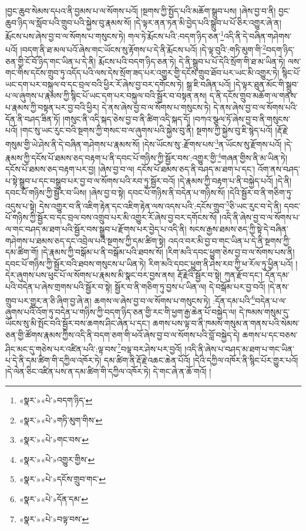 །བྱང་ཆུབ་སེམས་དཔའ་ནི་བྱམས་པ་ལ་སོགས་པའོ། །སྔགས་ཀྱི་སྤྱོད་པའི་མཆོག་སྒྲུབ་པས། །ཞེས་བྱ་བ་ནི། བྱང་ཆུབ་ཉིད་ལ་སློབ་པའི་གྲུབ་པའི་སྐྱེས་བུ་རྣམས་སོ། །དེ་ལྟར་ནན་ཏན་མི་བྱེད་པའི་སྒྲུབ་པ་པོ་ཅིར་འགྱུར་ཞེ་ན། རྨོངས་པས་ཞེས་བྱ་བ་ལ་སོགས་པ་གསུངས་ཏེ། གལ་ཏེ་རྨོངས་པའི་:བདག་ཉིད་ཅན་\footnote{«སྣར་»«པེ་»བདག་ཉིད་}འདི་ནི་དེ་བཞིན་གཤེགས་པའོ། །བདག་ནི་ཐ་མལ་པའོ་ཞེས་གང་ཡོངས་སུ་རྟོགས་པ་དེ་ནི་རྨོངས་པའོ། །དེ་ལྟ་བུའི་:གཏི་མུག་གི་\footnote{«སྣར་»«པེ་»གཏི་མུག་གིས་}བདག་ཉིད་ཅན་གྱི་ངོ་བོ་ཉིད་གང་ཡིན་པ་དེ་ནི། རྨོངས་པའི་བདག་ཉིད་ཅན་ཏེ། དེ་ནི་སྒྲུབ་པ་པོ་དེའི་སྲོག་གི་ཐ་མ་ཡིན་ཏེ། ལས་གང་གིས་དངོས་གྲུབ་ཏུ་འདོད་པའི་ལས་དེས་སྲོག་ཟད་པར་འགྱུར་གྱི་དངོས་གྲུབ་ཐོབ་པར་ཡང་མི་འགྱུར་ཏེ། སྙིང་པོ་ཡང་དག་པར་བསྐུལ་བ་དང་བྲལ་བའི་ཕྱིར་རོ་ཞེས་བྱ་བར་དགོངས་ཏེ། སྒྲ་ཇི་བཞིན་པའོ། །དེ་ལྟར་ཐུན་མོང་གི་སྒྲུབ་པ་ལ་ཞུགས་པ་རྣམས་ཀྱི་སྙིང་པོ་ཡང་དག་པར་བསྐུལ་བའི་སྦྱོར་བ་བསྟན་ནས། ད་ནི་དངོས་གྲུབ་མཆོག་ལ་གནས་པ་རྣམས་ཀྱི་བསྟན་པར་བྱ་བའི་ཕྱིར། དེ་ནས་ཞེས་བྱ་བ་ལ་སོགས་པ་གསུངས་ཏེ། དེ་ནས་ཞེས་བྱ་བ་ལ་སོགས་པའི་དོན་ནི་བཤད་ཟིན་ཏོ། །གསུང་ནི་འདི་སྐད་ཅེས་བྱ་བ་ནི་ཚིག་འདི་སྐད་དོ། །བཀའ་སྩལ་ཏོ་ཞེས་བྱ་བ་ནི་གསུངས་པའོ། །གང་སུ་ཡང་རུང་བའི་སྔགས་ཀྱི་གསང་བ་ལ་ཞུགས་པའི་སྐྱེས་བུ་ནི། སྔགས་ཀྱི་སྐྱེས་བུ་ཇི་སྙེད་པའོ། །རྡོ་རྗེ་གསུམ་གྱི་ཡེ་ཤེས་ནི་དེ་བཞིན་གཤེགས་པ་རྣམས་སོ། །དེས་ཡོངས་སུ་:རྫོགས་པས་\footnote{«སྣར་»«པེ་»གང་བས་}ན་ཡོངས་སུ་རྫོགས་པའོ། །དེ་རྣམས་ཀྱི་དངོས་པོ་ཐམས་ཅད་བརྟག་པ་ནི་དབང་པོ་གཉིས་ཀྱི་སྦྱོར་བས་:འགྱུར་གྱི་\footnote{«སྣར་»«པེ་»འགྱུར་གྱིས་}གཞན་གྱིས་ནི་མ་ཡིན་ཏེ། དངོས་པོ་ཐམས་ཅད་བརྟག་པར་བྱ། །ཞེས་བྱ་བ་ལ། དངོས་པོ་ཐམས་ཅད་ནི་བཤད་མ་ཐག་པ་དང་། འོག་ནས་བཤད་པ་སྟེ་སྒྲུབ་པ་དང་བསྒྲུབ་པར་བྱ་བ་ལ་སོགས་པའི་རབ་ཏུ་སྦྱོར་བའོ། །དེ་རྣམས་ཀྱི་བརྟག་པ་ནི་བསྐྱེད་པའོ། །དེ་ནི། དབང་པོ་གཉིས་ཀྱི་སྦྱོར་བ་ཡིས། །ཞེས་བྱ་བ་སྟེ། དབང་པོ་གཉིས་ནི་བདེན་པ་གཉིས་སོ། །དེའི་སྦྱོར་བ་ནི་གཅིག་ཏུ་འདུས་པ་སྟེ། དེས་འགྱུར་བ་ནི་འཇིག་རྟེན་དང་འཇིག་རྟེན་ལས་འདས་པའི་:དངོས་གྲུབ་\footnote{«སྣར་»«པེ་»དངོས་གྲུབ་གང་}ཅི་ཡང་རུང་བ་དེ་ནི། དབང་པོ་གཉིས་ཀྱི་སྦྱོར་བ་དང་བྲལ་བས་འགྲུབ་པར་མི་འགྱུར་རོ་ཞེས་བྱ་བར་དགོངས་སོ། །འདི་ནི་ཞེས་བྱ་བ་ལ་སོགས་པ་ལ་གང་བཤད་མ་ཐག་པའི་སྦྱོར་བས་སྒྲུབ་པ་རྫོགས་པར་བྱེད་པ་འདི་ནི། སངས་རྒྱས་ཐམས་ཅད་ཀྱི་སྟེ་དེ་བཞིན་གཤེགས་པ་ཐམས་ཅད་དང་འབྲེལ་པའི་སྔགས་ཀྱི་དམ་ཚིག་སྟེ། འདའ་བར་མི་བྱ་བ་གང་ཡིན་པ་དེ་ནི་སྔགས་ཀྱི་དམ་ཚིག་གོ། །དེ་རྣམས་ཀྱི་བསྒོམ་པ་ནི་བསྒོམ་པའི་ཐབས་སོ། །རིག་མའི་དབང་ཕྱུག་ཅེས་བྱ་བ་ལ་སོགས་པས་ནི། དབང་པོ་གཉིས་ཀྱི་སྦྱོར་བའི་ཐབས་གསུངས་པ་ཡིན་ཏེ། རིག་མའི་དབང་ཕྱུག་ནི་ཤེས་རབ་ཀྱི་ཕ་རོལ་ཏུ་ཕྱིན་པའོ། །དེར་ཞུགས་པས་ཕུང་པོ་ལ་སོགས་པ་རྣམས་མི་སྣང་བར་བྱས་ནས། རྡོ་རྗེའི་སྦྱོར་བ་སྟེ། ཀུན་རྫོབ་དང་། དོན་དམ་པའི་བདེན་པ་ཞེས་གྲགས་པའི་སྦྱོར་བ་སྟེ། སྦྱོར་བ་ནི་གཅིག་ཏུ་བྱས་པ་ཡིན་ལ། དེ་བསྒོམ་པར་བྱ་བའོ། །དེ་ནས་གྲུབ་པར་གྱུར་ན་ཅི་ཞིག་བྱ་ཞེ་ན། ཆགས་ལ་ཞེས་བྱ་བ་ལ་སོགས་པ་གསུངས་ཏེ། :དོན་དམ་པའི་\footnote{«སྣར་»«པེ་»དོན་དམ་}བདེན་པ་ལ་ཞུགས་པའི་འོག་ཏུ་བདེན་པ་གཉིས་ཀྱི་བདག་ཉིད་ཅན་གྱི་རང་གི་ཕྱག་རྒྱ་ཆེན་པོ་བསྐྱེད་ལ། དེ་ཁམས་གསུམ་དུ་ཡོངས་སུ་མི་སྤོང་བའི་སྦྱོར་བས་ཆགས་ཤིང་ཞེན་པ་དང་། ཆགས་པས་ལྟ་བ་ནི་ཁམས་གསུམ་ན་གནས་པའི་སེམས་ཅན་གྱི་ཚོགས་རྣམས་ཀྱིས་འདི་ནི་བདག་ཅག་གི་ཕའོ་ཞེས་བྱ་བ་ལ་སོགས་པའི་བློ་བསྐྱེད་དེ། ཆགས་པ་དང་བཅས་ཤིང་མང་དུ་གཅེས་པར་འཛིན་པའི་:ལྟ་བས་\footnote{«སྣར་»«པེ་»བལྟ་བས་}བལྟ་བར་ཤེས་པར་བྱའོ། །འདི་ནི་ཞེས་པ་བཤད་མ་ཐག་པ་གང་ཡིན་པ་དེ་ནི་དམ་ཚིག་གི་དཀྱིལ་འཁོར་ཏེ། དམ་ཚིག་ནི་རྡོ་རྗེ་འཆང་ཆེན་པོའོ། །དེའི་དཀྱིལ་འཁོར་ནི་སྙིང་པོར་གྱུར་པའོ། །དེ་ལེན་ཅིང་འཛིན་པས་ན་དམ་ཚིག་གི་དཀྱིལ་འཁོར་ཏེ། དེ་གང་ཞེ་ན་ཆོ་གའོ། །
